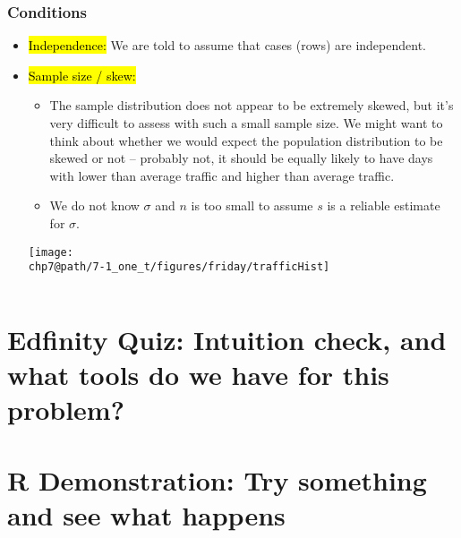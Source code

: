 \documentclass[slidestop,compress,mathserif]{beamer}
\makeatletter
\def\chp7@path{../../Chp 7}
\makeatother
\begin{document}

\begin{frame}
\frametitle{Conditions}

\begin{itemize}

\item \hl{Independence:} We are told to assume that cases (rows) are independent.

\pause

\item \hl{Sample size / skew:} $\:$ \\

\pause

{
{\tiny
\begin{itemize}

\item The sample distribution does not appear to be extremely skewed, but it's very difficult to assess with such a small sample size. We might want to think about whether we would expect the population distribution to be skewed or not -- probably not, it should be equally likely to have days with lower than average traffic and higher than average traffic.

\item We do not know $\sigma$ and $n$ is too small to assume $s$ is a reliable estimate for $\sigma$.
\end{itemize}
}
}
{
\texttt{[image: \\chp7@path/7-1\_one\_t/figures/friday/trafficHist]}
}

\end{itemize}

$\:$ \\

\pause


\end{frame}


\section{Edfinity Quiz: Intuition check, and what tools do we have for this problem?}


\section{R Demonstration: Try something and see what happens}
\end{document}
